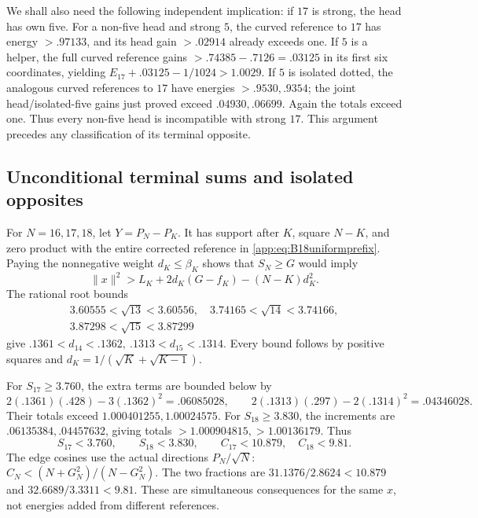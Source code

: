 \documentclass[11pt]{article}
\theoremstyle{definition}
\theoremstyle{remark}
\newcommand{\norm}[1]{\lVert #1\rVert}
\begin{document}
We shall also need the following independent implication:
if \(17\) is strong, the head has own five.
For a non-five head and strong \(5\), the curved reference to
\(17\) has energy \(>.97133\), and its head gain \(>.02914\)
already exceeds one. If \(5\) is a helper, the full curved
reference gains \(>.74385-.7126=.03125\) in its first six
coordinates, yielding
\(E_{17}+.03125-1/1024>1.0029\).
If \(5\) is isolated dotted, the analogous curved references
to \(17\) have energies \(>.9530,.9354\); the joint
head/isolated-five gains just proved exceed \(.04930,.06699\).
Again the totals exceed one. Thus every non-five head is
incompatible with strong \(17\). This argument precedes any
classification of its terminal opposite.

\subsection{Unconditional terminal sums and isolated opposites}
\label{app:B18sumcutoffs}
For \(N=16,17,18\), let \(Y=P_N-P_K\).
It has support after \(K\), square \(N-K\), and zero product
with the entire corrected reference in
\eqref{app:eq:B18uniformprefix}.
Paying the nonnegative weight \(d_K\leq\beta_K\) shows that
\(S_N\geq G\) would imply
\[
 \norm x^2>L_K+2d_K(G-f_K)-(N-K)d_K^2.
\]
The rational root bounds
\[
\begin{gathered}
3.60555<\sqrt{13}<3.60556,\quad
3.74165<\sqrt{14}<3.74166,\\
3.87298<\sqrt{15}<3.87299
\end{gathered}
\]
give
\(.1361<d_{14}<.1362,\ .1313<d_{15}<.1314\).
Every bound follows by positive squares and
\(d_K=1/(\sqrt K+\sqrt{K-1})\).

For \(S_{17}\geq3.760\), the extra terms are bounded below by
\[
 2(.1361)(.428)-3(.1362)^2=.06085028,\qquad
 2(.1313)(.297)-2(.1314)^2=.04346028.
\]
Their totals exceed \(1.000401255,1.00024575\).
For \(S_{18}\geq3.830\), the increments are
\(.06135384,.04457632\), giving totals
\(>1.000904815,>1.00136179\).
Thus
\begin{equation}\label{app:eq:B18sumbounds}
 S_{17}<3.760,\qquad S_{18}<3.830,\qquad
 C_{17}<10.879,\quad C_{18}<9.81 .
\end{equation}
The edge cosines use the actual directions
\(P_N/\sqrt N\):
\(C_N<(N+G_N^2)/(N-G_N^2)\).
The two fractions are
\(31.1376/2.8624<10.879\) and
\(32.6689/3.3311<9.81\).
These are simultaneous consequences for the same \(x\),
not energies added from different references.
\end{document}
